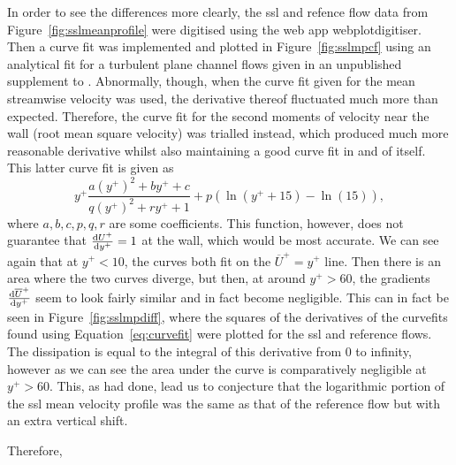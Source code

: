 In order to see the differences more clearly, the  \gls{ssl} and refence flow data from Figure~\ref{fig:sslmeanprofile} were digitised using the web app webplotdigitiser. Then a curve fit was implemented and plotted in Figure~\ref{fig:sslmpcf} using an analytical fit for a turbulent plane channel flows given in an unpublished supplement to \cite{chernyshenko2021}. Abnormally, though, when the curve fit given for the mean streamwise velocity was used, the derivative thereof fluctuated much more than expected. Therefore, the curve fit for the second moments of velocity near the wall (root mean square velocity) was trialled instead, which produced much more reasonable derivative whilst also maintaining a good curve fit in and of itself. This latter curve fit is given as
\begin{equation}
	y^{+}  \frac{a\left(y^{+}\right)^2 + by^{+} + c}{q\left(y^{+}\right)^2 + ry^{+} + 1} + p \left( \ln(y^{+}+15)-\ln(15)\right)\label{eq:curvefit}
,\end{equation}
where $a,b,c,p,q,r$ are some coefficients. This function, however, does not guarantee that $\dv{U^{+}}{y^{+}} =1$ at the wall, which would be most accurate. We can see again that at $y^{+}<10$, the curves both fit on the $\overline{U}^{+}=y^{+}$ line. Then there is an area where the two curves diverge, but then, at around $y^{+}>60$, the gradients $\dv{\overline{U}^{+}}{y^{+}} $ seem to look fairly similar and in fact become negligible. This can in fact be seen in Figure~\ref{fig:sslmpdiff}, where the squares of the derivatives of the curvefits found using Equation~\eqref{eq:curvefit} were plotted for the \gls{ssl} and reference flows. The dissipation is equal to the integral of this derivative from 0 to infinity, however as we can see the area under the curve is comparatively negligible at $y^{+}>60$. This, as \textcite{viotti2009} had done, lead us to conjecture that the logarithmic portion of the \gls{ssl} mean velocity profile was the same as that of the reference flow but with an extra vertical shift.

Therefore, 

